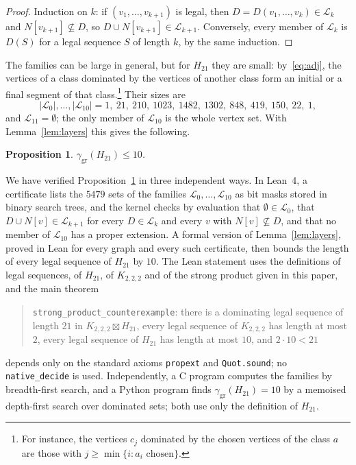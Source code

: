 \documentclass[11pt]{amsart}
\newtheorem{proposition}[theorem]{Proposition}
\theoremstyle{definition}
\theoremstyle{remark}
\numberwithin{equation}{section}
\newcommand{\ggr}{\gamma_{\mathrm{gr}}}
\newcommand{\sprod}{\boxtimes}
\newcommand{\oct}{K_{2,2,2}}
\begin{document}
\begin{proof}
Induction on $k$: if $(v_1,\dots,v_{k+1})$ is legal, then $D=D(v_1,\dots,v_k)\in\mathcal L_k$ and $N[v_{k+1}]\not\subseteq D$, so $D\cup N[v_{k+1}]\in\mathcal L_{k+1}$. Conversely, every member of $\mathcal L_k$ is $D(S)$ for a legal sequence $S$ of length $k$, by the same induction.
\end{proof}

The families can be large in general, but for $H_{21}$ they are small: by~\eqref{eq:adj}, the vertices of a class dominated by the vertices of another class form an initial or a final segment of that class.\footnote{For instance, the vertices $c_j$ dominated by the chosen vertices of the class $a$ are those with $j\ge\min\{i: a_i\text{ chosen}\}$.} Their sizes are
\[
  |\mathcal L_0|,\dots,|\mathcal L_{10}| = 1,\ 21,\ 210,\ 1023,\ 1482,\ 1302,\ 848,\ 419,\ 150,\ 22,\ 1,
\]
and $\mathcal L_{11}=\emptyset$; the only member of $\mathcal L_{10}$ is the whole vertex set. With Lemma~\ref{lem:layers} this gives the following.

\begin{proposition}\label{prop:h21upper}
$\ggr(H_{21})\le10$.
\end{proposition}

We have verified Proposition~\ref{prop:h21upper} in three independent ways. In Lean~4, a certificate lists the $5479$ sets of the families $\mathcal L_0,\dots,\mathcal L_{10}$ as bit masks stored in binary search trees, and the kernel checks by evaluation that $\emptyset\in\mathcal L_0$, that $D\cup N[v]\in\mathcal L_{k+1}$ for every $D\in\mathcal L_k$ and every $v$ with $N[v]\not\subseteq D$, and that no member of $\mathcal L_{10}$ has a proper extension. A formal version of Lemma~\ref{lem:layers}, proved in Lean for every graph and every such certificate, then bounds the length of every legal sequence of $H_{21}$ by $10$. The Lean statement uses the definitions of legal sequences, of $H_{21}$, of $\oct$ and of the strong product given in this paper, and the main theorem
\begin{quote}\small
\texttt{strong\_product\_counterexample}: there is a dominating legal sequence of length $21$ in $\oct\sprod H_{21}$, every legal sequence of $\oct$ has length at most $2$, every legal sequence of $H_{21}$ has length at most $10$, and $2\cdot10<21$
\end{quote}
depends only on the standard axioms \texttt{propext} and \texttt{Quot.sound}; no \texttt{native\_decide} is used. Independently, a C program computes the families by breadth-first search, and a Python program finds $\ggr(H_{21})=10$ by a memoised depth-first search over dominated sets; both use only the definition of $H_{21}$.
\end{document}
